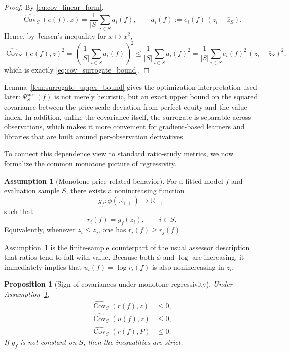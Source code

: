 \documentclass[12pt, draft]{article}
\theoremstyle{plain}
\newtheorem{proposition}{Proposition}
\theoremstyle{definition}
\newtheorem{assumption}{Assumption}
\newcommand{\1}{\mathbf{1}}
\begin{document}
{\begin{proof}
By \eqref{eq:cov_linear_form},
\[
\widehat{\operatorname{Cov}}_S(e(f),z)
=
\frac{1}{|S|}
\sum_{i\in S} a_i(f),
\qquad
a_i(f):=e_i(f)\,(z_i-\bar z_S).
\]
Hence, by Jensen's inequality for $x\mapsto x^2$,
\[
\widehat{\operatorname{Cov}}_S(e(f),z)^2
=
\left(
\frac{1}{|S|}
\sum_{i\in S} a_i(f)
\right)^2
\le
\frac{1}{|S|}
\sum_{i\in S} a_i(f)^2
=
\frac{1}{|S|}
\sum_{i\in S} e_i(f)^2\,(z_i-\bar z_S)^2,
\]
which is exactly \eqref{eq:cov_surrogate_bound}.
\end{proof}

Lemma~\ref{lem:surrogate_upper_bound} gives the optimization interpretation used later: $\Psi_S^{\mathrm{surr}}(f)$ is not merely heuristic, but an exact upper bound on the squared covariance between the price-scale deviation from perfect equity and the value index. In addition, unlike the covariance itself, the surrogate is separable across observations, which makes it more convenient for gradient-based learners and libraries that are built around per-observation derivatives.

To connect this dependence view to standard ratio-study metrics, we now formalize the common monotone picture of regressivity.

\begin{assumption}[Monotone price-related behavior]
\label{ass:monotone_regressivity}
For a fitted model $f$ and evaluation sample $S$, there exists a nonincreasing function
\[
g_f:\phi(\mathbb{R}_{++})\to\mathbb{R}_{++}
\]
such that
\[
r_i(f)=g_f(z_i),
\qquad i\in S.
\]
Equivalently, whenever $z_i\le z_j$, one has $r_i(f)\ge r_j(f)$.
\end{assumption}

Assumption~\ref{ass:monotone_regressivity} is the finite-sample counterpart of the usual assessor description that ratios tend to fall with value. Because both $\phi$ and $\log$ are increasing, it immediately implies that $u_i(f)=\log r_i(f)$ is also nonincreasing in $z_i$.

\begin{proposition}[Sign of covariances under monotone regressivity]
\label{prop:cov_signs}
Under Assumption~\ref{ass:monotone_regressivity},
\begin{align}
\widehat{\operatorname{Cov}}_S(r(f),z) &\le 0,
\label{eq:cov_r_z_negative}
\\
\widehat{\operatorname{Cov}}_S(u(f),z) &\le 0,
\label{eq:cov_u_z_negative}
\\
\widehat{\operatorname{Cov}}_S(r(f),P) &\le 0.
\label{eq:cov_r_p_negative}
\end{align}
If $g_f$ is not constant on $S$, then the inequalities are strict.
\end{proposition}

}
\end{document}

